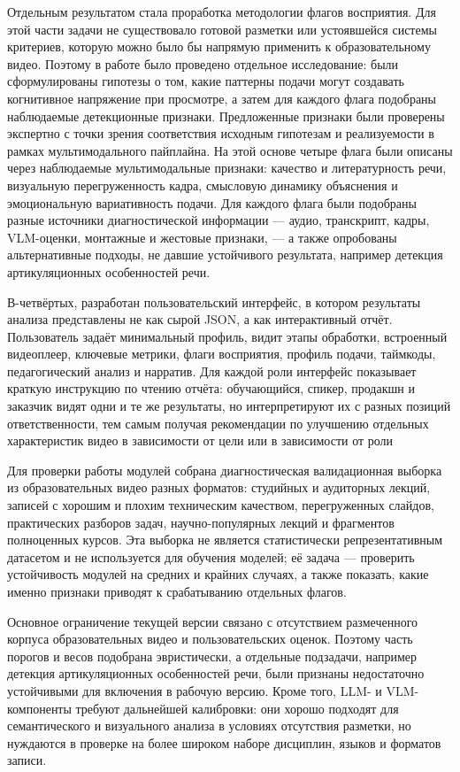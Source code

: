 Отдельным результатом стала проработка методологии флагов восприятия.
Для этой части задачи не существовало готовой разметки или устоявшейся
системы критериев, которую можно было бы напрямую применить к образовательному
видео. Поэтому в работе было проведено отдельное исследование: были
сформулированы гипотезы о том, какие паттерны подачи могут создавать
когнитивное напряжение при просмотре, а затем для каждого флага подобраны
наблюдаемые детекционные признаки. Предложенные признаки были проверены
экспертно с точки зрения соответствия исходным гипотезам и реализуемости
в рамках мультимодального пайплайна. На этой основе четыре флага были
описаны через наблюдаемые мультимодальные признаки: качество и литературность
речи, визуальную перегруженность кадра, смысловую динамику объяснения и
эмоциональную вариативность подачи. Для каждого флага были подобраны
разные источники диагностической информации — аудио, транскрипт, кадры,
VLM-оценки, монтажные и жестовые признаки, — а также опробованы альтернативные
подходы, не давшие устойчивого результата, например детекция артикуляционных
особенностей речи.

В-четвёртых, разработан пользовательский интерфейс, в котором результаты
анализа представлены не как сырой JSON, а как интерактивный отчёт. Пользователь
задаёт минимальный профиль, видит этапы обработки, встроенный видеоплеер,
ключевые метрики, флаги восприятия, профиль подачи, таймкоды, педагогический
анализ и нарратив. Для каждой роли интерфейс показывает краткую инструкцию
по чтению отчёта: обучающийся, спикер, продакшн и заказчик видят одни и те же
результаты, но интерпретируют их с разных позиций ответственности,
тем самым получая рекомендации по улучшению отдельных характеристик видео в зависимости от цели или в зависимости от роли

Для проверки работы модулей собрана диагностическая валидационная выборка
из образовательных видео разных форматов: студийных и аудиторных лекций,
записей с хорошим и плохим техническим качеством, перегруженных слайдов,
практических разборов задач, научно-популярных лекций и фрагментов полноценных
курсов. Эта выборка не является статистически репрезентативным датасетом и
не используется для обучения моделей; её задача — проверить устойчивость
модулей на средних и крайних случаях, а также показать, какие именно признаки
приводят к срабатыванию отдельных флагов.

Основное ограничение текущей версии связано с отсутствием размеченного корпуса
образовательных видео и пользовательских оценок. Поэтому часть порогов и весов
подобрана эвристически, а отдельные подзадачи, например детекция
артикуляционных особенностей речи, были признаны недостаточно устойчивыми
для включения в рабочую версию. Кроме того, LLM- и VLM-компоненты требуют
дальнейшей калибровки: они хорошо подходят для семантического и визуального
анализа в условиях отсутствия разметки, но нуждаются в проверке на более
широком наборе дисциплин, языков и форматов записи.

